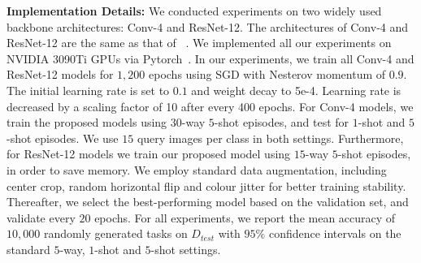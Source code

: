 \documentclass[letterpaper]{article} %
\begin{document}
\textbf{Implementation Details:}
{We conducted experiments on two widely used backbone architectures: Conv-4 and ResNet-12. The architectures of Conv-4 and ResNet-12 are the same as that of ~\cite{Wertheimer_2021_CVPR, Ye_2020_CVPR}.
We implemented all our experiments on NVIDIA 3090Ti GPUs via Pytorch~\cite{Paszke2019PyTorchAI}.
In our experiments, we train all Conv-4 and ResNet-12 models for $1,200$ epochs using SGD with Nesterov momentum of $0.9$. The initial learning rate is set to $0.1$ and weight decay to 5e-4. Learning rate is decreased by a scaling factor of 10 after every 400 epochs.
For Conv-4 models, we train the proposed models using $30$-way $5$-shot episodes, and test for $1$-shot and $5$-shot episodes. We use $15$ query images per class in both settings. 
Furthermore, for ResNet-12 models we train our proposed model using $15$-way $5$-shot episodes, in order to save memory. 
We employ standard data augmentation, including center crop, random horizontal flip and colour jitter for better training stability. Thereafter, we select the best-performing model based on the validation set, and validate every $20$ epochs. For all experiments, we report the mean accuracy of $10,000$ randomly generated tasks on $D_{test}$ with $95\%$ confidence intervals on the standard $5$-way, $1$-shot and $5$-shot settings.}
\end{document}
